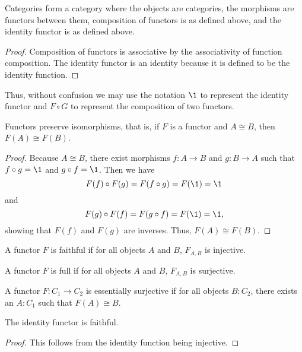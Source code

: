 \documentclass[../../math.tex]{subfiles}
\begin{document}
\begin{theorem}
    Categories form a category \Cat where the objects are categories, the
    morphisms are functors between them, composition of functors is as defined
    above, and the identity functor is as defined above.
\end{theorem}
\begin{proof}
    Composition of functors is associative by the associativity of function
    composition.  The identity functor is an identity because it is defined to
    be the identity function.
\end{proof}

Thus, without confusion we may use the notation $\1$ to represent the
identity functor and $F \circ G$ to represent the composition of two functors.

\begin{theorem}
    Functors preserve isomorphisms, that is, if $F$ is a functor and $A \cong
    B$, then $F(A) \cong F(B)$.
\end{theorem}
\begin{proof}
    Because $A \cong B$, there exist morphisms $f : A \to B$ and $g : B \to A$
    such that $f \circ g = \1$ and $g \circ f = \1$.  Then we have
    \[
        F(f) \circ F(g) = F(f \circ g) = F(\1) = \1
    \]
    and
    \[
        F(g) \circ F(f) = F(g \circ f) = F(\1) = \1,
    \]
    showing that $F(f)$ and $F(g)$ are inverses.  Thus, $F(A) \cong F(B)$.
\end{proof}

\begin{definition}
    A functor $F$ is faithful if for all objects $A$ and $B$, $F_{A,B}$ is
    injective.
\end{definition}

\begin{definition}
    A functor $F$ is full if for all objects $A$ and $B$, $F_{A,B}$ is
    surjective.
\end{definition}

\begin{definition}
    A functor $F : C_1 \to C_2$ is essentially surjective if for all objects $B
    : C_2$, there exists an $A : C_1$ such that $F(A) \cong B$.
\end{definition}

\begin{theorem}
    The identity functor is faithful.
\end{theorem}
\begin{proof}
    This follows from the identity function being injective.
\end{proof}
\end{document}
